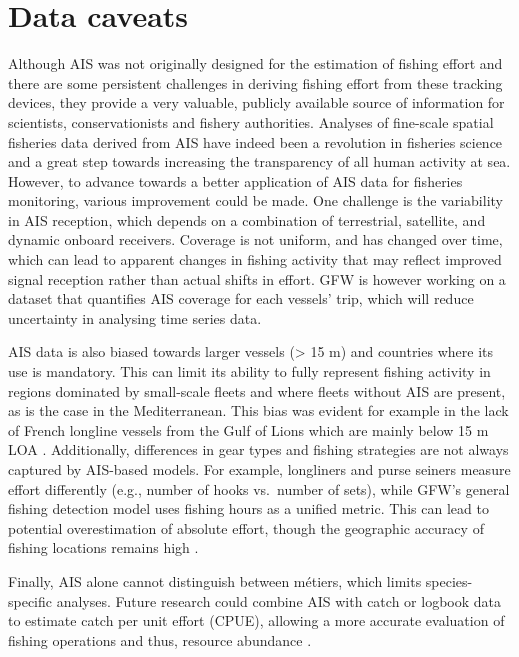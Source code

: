 \section{Data caveats}
Although AIS was not originally designed for the estimation of fishing effort and there are some
persistent challenges in deriving fishing effort from these tracking devices, they provide a very
valuable, publicly available source of information for scientists, conservationists and fishery
authorities. Analyses of fine-scale spatial fisheries data derived from AIS have indeed been a
revolution in fisheries science and a great step towards increasing the transparency of all human
activity at sea. However, to advance towards a better application of AIS data for fisheries
monitoring, various improvement could be made. One challenge is the variability in AIS reception,
which depends on a combination of terrestrial, satellite, and dynamic onboard receivers. Coverage
is not uniform, and has changed over time, which can lead to apparent changes in fishing activity
that may reflect improved signal reception rather than actual shifts in effort. GFW is however
working on a dataset that quantifies AIS coverage for each vessels' trip, which will reduce
uncertainty in analysing time series data.

\medskip

AIS data is also biased towards larger vessels (> 15 m) and countries where its use is mandatory.
This can limit its ability to fully represent fishing activity in regions dominated by small-scale
fleets and where fleets without AIS are present, as is the case in the Mediterranean. This bias was
evident for example in the lack of French longline vessels from the Gulf of Lions which are mainly
below 15 m LOA \citep{french_longlines}. Additionally, differences in gear types and fishing
strategies are not always captured by AIS-based models. For example, longliners and purse seiners
measure effort differently (e.g., number of hooks vs.\ number of sets), while GFW’s general fishing
detection model uses fishing hours as a unified metric. This can lead to potential overestimation
of absolute effort, though the geographic accuracy of fishing locations remains high \citep{bias}.

\medskip

Finally, AIS alone cannot distinguish between métiers, which limits species-specific analyses.
Future research could combine AIS with catch or logbook data to estimate catch per unit effort
(CPUE), allowing a more accurate evaluation of fishing operations and thus, resource abundance
\citep{niu_ais_cpue}.

